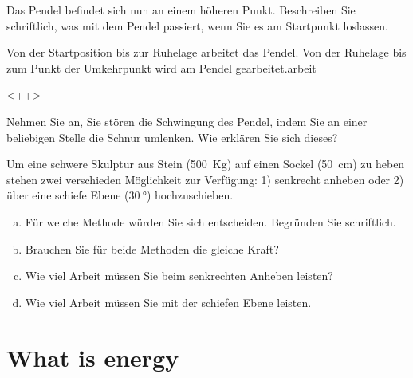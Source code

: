\documentclass[12pt,a4paper,twoside]{article}
\begin{document}
\begin{aufgabe}
	Das Pendel befindet sich nun an einem höheren Punkt.
	Beschreiben Sie schriftlich, was mit dem Pendel passiert, wenn Sie es am Startpunkt loslassen.
\end{aufgabe}

\begin{aufgabe}
	Von der Startposition bis zur Ruhelage arbeitet das Pendel.
	Von der Ruhelage bis zum Punkt der Umkehrpunkt wird am Pendel gearbeitet.arbeit
\end{aufgabe}<++>


\begin{aufgabe}
	Nehmen Sie an, Sie stören die Schwingung des Pendel, indem Sie an einer beliebigen Stelle die Schnur umlenken.
	Wie erklären Sie sich dieses?
\end{aufgabe}



\begin{aufgabe}
	Um eine schwere Skulptur aus Stein (\SI{500}{Kg}) auf einen Sockel (\SI{50}{cm}) zu heben stehen zwei verschieden Möglichkeit zur Verfügung:
	1) senkrecht anheben oder 2) über eine schiefe Ebene ($\SI{30}{\degree}$) hochzuschieben.

	\begin{enumerate}[a)]
		\item Für welche Methode würden Sie sich entscheiden. Begründen Sie schriftlich.
		\item Brauchen Sie für beide Methoden die gleiche Kraft?
		\item Wie viel Arbeit müssen Sie beim senkrechten Anheben leisten?
		\item Wie viel Arbeit müssen Sie mit der schiefen Ebene leisten.
	\end{enumerate}
\end{aufgabe}

\section{What is energy}




\newpage
{}
\end{document}

